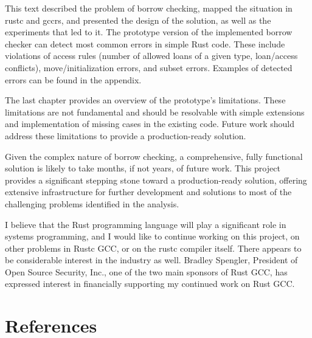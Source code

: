 \documentclass[
  11pt,
  twoside,symmetric]{report}
\begin{document}
This text described the problem of borrow checking, mapped the situation
in rustc and gccrs, and presented the design of the solution, as well as
the experiments that led to it. The prototype version of the implemented
borrow checker can detect most common errors in simple Rust code. These
include violations of access rules (number of allowed loans of a given
type, loan/access conflicts), move/initialization errors, and subset
errors. Examples of detected errors can be found in the appendix.

The last chapter provides an overview of the prototype's limitations.
These limitations are not fundamental and should be resolvable with
simple extensions and implementation of missing cases in the existing
code. Future work should address these limitations to provide a
production-ready solution.

Given the complex nature of borrow checking, a comprehensive, fully
functional solution is likely to take months, if not years, of future
work. This project provides a significant stepping stone toward a
production-ready solution, offering extensive infrastructure for further
development and solutions to most of the challenging problems identified
in the analysis.

I believe that the Rust programming language will play a significant
role in systems programming, and I would like to continue working on
this project, on other problems in Rustc GCC, or on the rustc compiler
itself. There appears to be considerable interest in the industry as
well. Bradley Spengler, President of Open Source Security, Inc., one of
the two main sponsors of Rust GCC, has expressed interest in financially
supporting my continued work on Rust GCC.

\appendix

\chapter{References}\label{sec:references}
\end{document}
